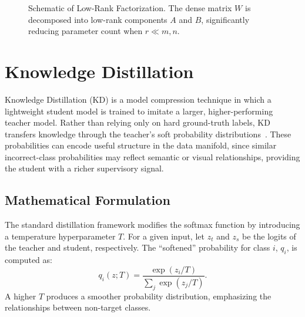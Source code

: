 \begin{figure}[htbp]
  \centering
  \caption{Schematic of Low-Rank Factorization. The dense matrix $W$ is decomposed into low-rank components $A$ and $B$, significantly reducing parameter count when $r \ll m, n$.}
  \label{fig:lowrank_concept}
\end{figure}

\section{Knowledge Distillation}

Knowledge Distillation (KD) is a model compression technique in which a lightweight student model is trained to imitate a larger, higher-performing teacher model. Rather than relying only on hard ground-truth labels, KD transfers knowledge through the teacher's soft probability distributions~\cite{hinton2015distilling}. These probabilities can encode useful structure in the data manifold, since similar incorrect-class probabilities may reflect semantic or visual relationships, providing the student with a richer supervisory signal.

\subsection{Mathematical Formulation}

The standard distillation framework modifies the softmax function by introducing a temperature hyperparameter $T$. For a given input, let $z_t$ and $z_s$ be the logits of the teacher and student, respectively. The ``softened'' probability for class $i$, $q_i$, is computed as:
\begin{equation}
    q_i(z; T) = \frac{\exp(z_i / T)}{\sum_j \exp(z_j / T)}.
    \label{eq:softmax_temp}
\end{equation}
A higher $T$ produces a smoother probability distribution, emphasizing the relationships between non-target classes.

